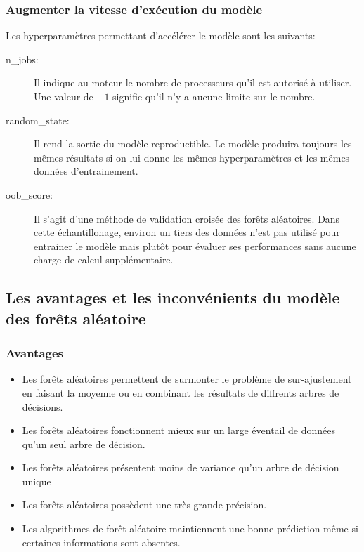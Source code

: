   \subsubsection{Augmenter la vitesse d'exécution du modèle}

  Les hyperparamètres permettant d'accélérer le modèle sont les suivants:
  \begin{description}
    \item[n\_jobs: ] Il indique au moteur le nombre de processeurs qu'il est autorisé
      à utiliser. Une valeur de $-1$ signifie qu'il n'y a aucune limite sur le
      nombre.
    \item[random\_state: ] Il rend la sortie du modèle reproductible. Le modèle
      produira toujours les mêmes résultats si on lui donne les mêmes
      hyperparamètres et les mêmes données d'entrainement.
    \item[oob\_score: ] Il s'agit d'une méthode de validation croisée des forêts
      aléatoires. Dans cette échantillonage, environ un tiers des données n'est
      pas utilisé pour entrainer le modèle mais plutôt pour évaluer ses
      performances sans aucune charge de calcul supplémentaire.
  \end{description}


\subsection{Les avantages et les inconvénients du modèle des forêts aléatoire}

\subsubsection{Avantages}
\begin{itemize}
  \item Les forêts aléatoires permettent de surmonter le problème de
    sur-ajustement en faisant la moyenne ou en combinant les résultats de
    diffrents arbres de décisions.
  \item Les forêts aléatoires fonctionnent mieux sur un large éventail de
    données qu'un seul arbre de décision.
  \item Les forêts aléatoires présentent moins de variance qu'un arbre de
    décision unique
  \item Les forêts aléatoires possèdent une très grande précision.
  \item Les algorithmes de forêt aléatoire maintiennent une bonne prédiction
    même si certaines informations sont absentes.
\end{itemize}

